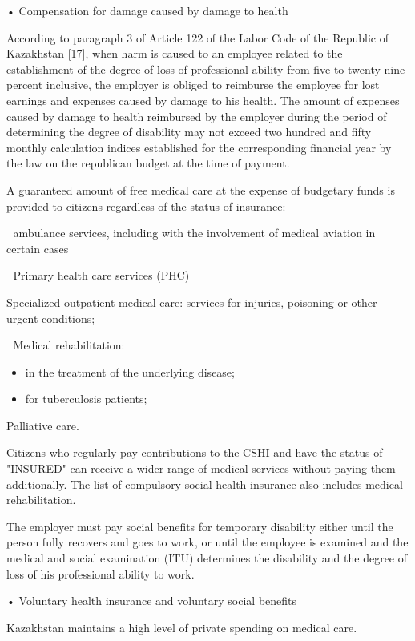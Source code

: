 \begin{multicols}{2}
• Compensation for damage caused by damage to health

According to paragraph 3 of Article 122 of the Labor Code of the
Republic of Kazakhstan {[}17{]}, when harm is caused to an employee
related to the establishment of the degree of loss of professional
ability from five to twenty-nine percent inclusive, the employer is
obliged to reimburse the employee for lost earnings and expenses caused
by damage to his health. The amount of expenses caused by damage to
health reimbursed by the employer during the period of determining the
degree of disability may not exceed two hundred and fifty monthly
calculation indices established for the corresponding financial year by
the law on the republican budget at the time of payment.

A guaranteed amount of free medical care at the expense of budgetary
funds is provided to citizens regardless of the status of insurance:

 ambulance services, including with the involvement of medical aviation
in certain cases

 Primary health care services (PHC)

Specialized outpatient medical care: services for injuries, poisoning or
other urgent conditions;

 Medical rehabilitation:

\begin{itemize}
\item
  in the treatment of the underlying disease;
\item
  for tuberculosis patients;
\end{itemize}

Palliative care.

Citizens who regularly pay contributions to the CSHI and have the status
of "INSURED" can receive a wider range of medical services without
paying them additionally. The list of compulsory social health insurance
also includes medical rehabilitation.

The employer must pay social benefits for temporary disability either
until the person fully recovers and goes to work, or until the employee
is examined and the medical and social examination (ITU) determines the
disability and the degree of loss of his professional ability to work.

• Voluntary health insurance and voluntary social benefits

Kazakhstan maintains a high level of private spending on medical care.


\end{multicols}
